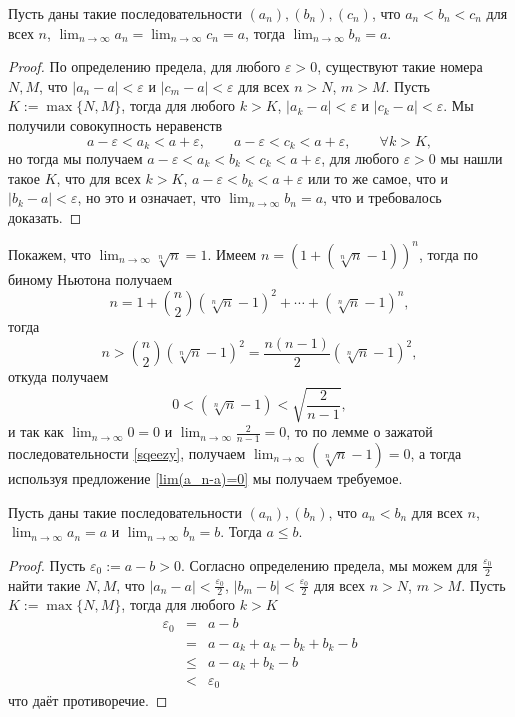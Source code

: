 \begin{lemma}\label{sqeezy}
    Пусть даны такие последовательности $(a_n), (b_n), (c_n)$, что $a_n<b_n<c_n$ для всех $n$, $\lim_{n \to \infty} a_n = \lim_{n \to \infty} c_n = a$, тогда $\lim_{n \to \infty} b_n = a.$
\end{lemma}
\begin{proof}
   По определению предела, для любого $\varepsilon >0$, существуют такие номера $N,M$, что $|a_n - a| < \varepsilon$ и $|c_m - a|< \varepsilon$ для всех $n>N$, $m>M$. Пусть $K:=\max\{N,M\}$, тогда для любого $k>K$, $|a_k - a| < \varepsilon$ и $|c_k - a|< \varepsilon$. Мы получили совокупность неравенств
   \[
   a - \varepsilon < a_k < a+ \varepsilon, \qquad a -\varepsilon < c_k < a+ \varepsilon, \qquad \forall k >K,
   \]
   но тогда мы получаем $a- \varepsilon < a_k < b_k < c_k < a + \varepsilon$, \ie для любого $\varepsilon>0$ мы нашли такое $K$, что для всех $k>K$, $a- \varepsilon < b_k < a+ \varepsilon$ или то же самое, что и $|b_k -a|< \varepsilon$, но это и означает, что $\lim_{n \to \infty}b_n = a$, что и требовалось доказать.
\end{proof}

\begin{example}\label{sqrt[n]{n}->1}
    Покажем, что $\lim_{n\to \infty}\sqrt[n]{n} = 1$. Имеем $n = \left(1+ (\sqrt[n]{n}-1) \right)^n$, тогда по биному Ньютона получаем
    \[
     n = 1 + \binom{n}{2} (\sqrt[n]{n} - 1)^2 + \cdots + (\sqrt[n]{n} - 1)^n,
    \]
    тогда
    \[
     n > \binom{n}{2} (\sqrt[n]{n} - 1)^2 = \frac{n(n-1)}{2} (\sqrt[n]{n} - 1)^2, 
    \]
    откуда получаем 
    \[
     0 < (\sqrt[n]{n} - 1) < \sqrt{\frac{2}{n-1}} ,
    \]
    и так как $\lim_{n\to \infty} 0 = 0$ и $\lim_{n\to \infty} \frac{2}{n-1} = 0$, то по лемме о зажатой последовательности \ref{sqeezy}, получаем $\lim_{n\to \infty} (\sqrt[n]{n} - 1) = 0$, а тогда используя предложение \ref{lim(a_n-a)=0} мы получаем требуемое.   
    
\end{example}


\begin{lemma}\label{a<b}
 Пусть даны такие последовательности $ (a_n ),  (b_n )$, что $a_n<b_n$ для всех $n$, $\lim_{n \to \infty} a_n =a$ и $\lim_{n \to \infty} b_n = b$. Тогда $a\le b$. 
\end{lemma}
\begin{proof}
Пусть $\varepsilon_0:=a-b >0$. Согласно определению предела, мы можем для $\frac{\varepsilon_0}{2}$ найти такие $N,M$, что $|a_n - a|<\frac{\varepsilon_0}{2}$, $|b_m-b|<\frac{\varepsilon_0}{2}$ для всех $n>N$, $m>M$.  Пусть $K:=\max\{N,M\}$, тогда для любого $k>K$
\begin{eqnarray*}
    \varepsilon_0 &=& a-b\\
    &=& a-a_k + a_k - b_k+b_k - b \\
    &\le &a-a_k + b_k-b \\
    &<&\varepsilon_0
\end{eqnarray*}
что даёт противоречие.

\end{proof}

